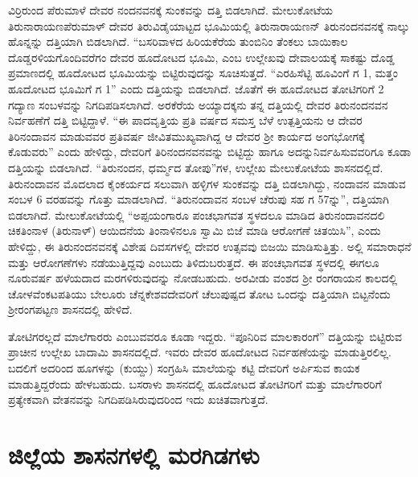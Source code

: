 ವಿರ್ರಿರುಂದ ಪೆರುಮಾಳೆ ದೇವರ ನಂದನವನಕ್ಕೆ ಸುಂಕವನ್ನು ದತ್ತಿ ಬಿಡಲಾಗಿದೆ. ಮೇಲುಕೋಟೆಯ ತಿರುನಾರಾಯಣಪೆರುಮಾಳ್​ ದೇವರ ತಿರುವಿಡೈಯಾಟ್ಟದ ಭೂಮಿಯಲ್ಲಿ ತಿರುನಾರಾಯಣನ್​ ತಿರುನಂದನವನಕ್ಕೆ ನಾಲ್ಕು ಹೊನ್ನನ್ನು ದತ್ತಿಯಾಗಿ ಬಿಡಲಾಗಿದೆ. “ಬಸರಿವಾಳದ ಹಿರಿಯಕೆರೆಯ ತುಂಬಿನಿಂ ತೆಂಕಲು ಬಾಯಿಕಾಲ ದೊಡ್ಡರಳಿಯಗೊಂದಿವರೆಗಂ ದೇವರ ಹೂದೋಟದ ಭೂಮಿ, ಎಂಬ ಉಲ್ಲೇಖವು ದೇವಾಲಯಕ್ಕೆ ಸಾಕಷ್ಟು ದೊಡ್ಡ ಪ್ರಮಾಣದಲ್ಲಿ ಹೂದೋಟದ ಭೂಮಿಯನ್ನು ಬಿಟ್ಟಿರುವುದನ್ನು ಸೂಚಿಸುತ್ತದೆ. “ಎರಹಿಸೆಟ್ಟಿ ಹೂವಿಂಗೆ ಗ 1, ಮತ್ತಂ ಹೂದೋಟದ ಭೂಮಿಗೆ ಗ 1” ಎಂದು ದತ್ತಿಯನ್ನು ಬಿಡಲಾಗಿದೆ. ಜೊತೆಗೆ ಈ ಹೂದೋಟದ ತೋಟಿಗರಿಗೆ 2 ಗದ್ಯಾಣ ಸಂಬಳವನ್ನು ನಿಗದಿಪಡಿಸಲಾಗಿದೆ. ಅರಕೆರೆಯ ಅಯ್ಯಾದಕ್ಕನು ತನ್ನ ದತ್ತಿಯಲ್ಲಿ ದೇವರ ತಿರುನಂದನವನ ನಿರ್ವಹಣೆಗೆ ದತ್ತಿ ಬಿಟ್ಟಿದ್ದಾಳೆ. “ಈ ಪಾದವೃತ್ತಿಯ ಪ್ರತಿ ವರ್ಷದ ಸಮಸ್ತ ಬೆಳೆ ಉತ್ಪತ್ತಿಯನು ಆ ದೇವರ ತಿರಿನಂದಾವನ ಮಾಡುವವರ ಪ್ರತಿವರ್ಷ ಜೀವಿತಮುಖ್ಯವಾಗಿದ್ದ ಆ ದೇವರ ಶ‍್ರೀ ಕಾರ್ಯದ ಅಂಗಭೋಗಕ್ಕೆ ಕೊಡುವರು” ಎಂದು ಹೇಳಿದ್ದು, ದೇವರಿಗೆ ತಿರಿನಂದನವನವನ್ನು ಬಿಟ್ಟಿದ್ದು ಹಾಗೂ ಅದನ್ನು\break ನಿರ್ವಹಿಸುವವರಿಗೂ ಕೂಡಾ ದತ್ತಿಯನ್ನು ಬಿಡಲಾಗಿದೆ. “ತಿರುನಂದನ, ಧರ್ಮ್ಮದ ತೋಪು”ಗಳ, ಉಲ್ಲೇಖ ಮೇಲುಕೋಟೆಯ ಶಾಸನದಲ್ಲಿದೆ. ತಿರುನಂದಾವನ ಮೊದಲಾದ ಕೈಂಕರ್ಯದ ಸಲುವಾಗಿ ಹಳ್ಳಿಗಳ ಸುಂಕವನ್ನು ದತ್ತಿ ಬಿಡಲಾಗಿದ್ದು, ನಂದಾವನ ಮಾಡುವ ಸಂಬಳ 6 ವರಹವನ್ನು ಗೊತ್ತು ಮಾಡಲಾಗಿದೆ. “ತಿರುನಂದಾವನ ಸಂಬಳ ಚೆರುಪು ಸಹ ಗ 57ನ್ನು”, ದತ್ತಿಯಾಗಿ ಬಿಡಲಾಗಿದೆ. ಮೇಲುಕೋಟೆಯಲ್ಲಿ “ಅಪ್ಪಯಂಗಾರೂ ಪಂಚಭಾಗವತ ಸ್ಥಳದಲೂ ಮಾಡಿದ ತಿರುನಂದಾವನದಲಿ ಚಿಕತಿಂನಾಳ (ತಿರುನಾಳ್) ಆಯಿದನೆಯ ತಿಂನಾಳಿನಲೂ ಸ್ವಾಮಿ ಬಿಜೆ ಮಾಡಿ ಆರೋಗಣೆ ಚಿತಯಿಸಿ”, ಎಂದು ಹೇಳಿದ್ದು, ಈ ತಿರುನಂದನವನಕ್ಕೆ ವಿಶೇಷ ದಿವಸಗಳಲ್ಲಿ ದೇವರ ಉತ್ಸವವು ಬಿಜಯಿ ಮಾಡಿಸುತ್ತಿತ್ತು. ಅಲ್ಲಿ ಸಮಾರಾಧನೆ ಮತ್ತು ಆರೋಗಣೆಗಳು ನಡೆಯುತ್ತಿದ್ದವು ಎಂಬುದು ತಿಳಿದುಬರುತ್ತದೆ. ಈ ಪಂಚಭಾಗವತ ಸ್ಥಳದಲ್ಲಿ ಈಗಲೂ ನೂರುವರ್ಷ ಹಳೆಯದಾದ ಮರಗಳಿರುವುದನ್ನು ನೋಡಬಹುದು. ಅರವೀಡು ವಂಶದ ಶ‍್ರೀ ರಂಗರಾಯನ ಕಾಲದಲ್ಲಿ ಚೋಳವೆಂಕಟಪತಿಯು ಬೇಲೂರು ಚೆನ್ನಕೇಶವ\-ದೇವರಿಗೆ ಚೆಲುಪುಷ್ಪದ ತೋಟ ಒಂದನ್ನು ದತ್ತಿಯಾಗಿ ಬಿಟ್ಟನೆಂದು ಶ‍್ರೀರಂಗಪಟ್ಟಣ ಶಾಸನದಲ್ಲಿ ಹೇಳಿದೆ.

ತೋಟಿಗರಲ್ಲದೆ ಮಾಲೆಗಾರರು ಎಂಬುವವರೂ ಕೂಡಾ ಇದ್ದರು. “ಪೂನಿರಿವ ಮಾಲಕಾರಂಗೆ” ದತ್ತಿಯನ್ನು ಬಿಟ್ಟಿರುವ ಪ್ರಾಚೀನ ಉಲ್ಲೇಖ ಬಾದಾಮಿ ಶಾಸನದಲ್ಲಿದೆ. ಇವರು ದೇವರ ಹೂದೋಟದ ನಿರ್ವಹಣೆಯನ್ನು ಮಾಡುತ್ತಿರಲಿಲ್ಲ. ಬದಲಿಗೆ ಅದರಿಂದ ಹೂಗಳನ್ನು (ಕುಯ್ದು) ಸಂಗ್ರಹಿಸಿ ಮಾಲೆಯನ್ನು ಕಟ್ಟಿ ದೇವರಿಗೆ ಅರ್ಪಿಸುವ ಕಾಯಕ ಮಾಡುತ್ತಿದ್ದರೆಂದು ಹೇಳಬಹುದು. ಬಸರಾಳು ಶಾಸನದಲ್ಲಿ ಹೂದೋಟದ ತೋಟಿಗರಿಗೆ ಮತ್ತು ಮಾಲೆಗಾರರಿಗೆ ಪ್ರತ್ಯೇಕವಾಗಿ ವೇತನವನ್ನು ನಿಗದಿಪಡಿಸಿರುವುದರಿಂದ ಇದು ಖಚಿತವಾಗುತ್ತದೆ.


\section{ಜಿಲ್ಲೆಯ ಶಾಸನಗಳಲ್ಲಿ ಮರಗಿಡಗಳು}

